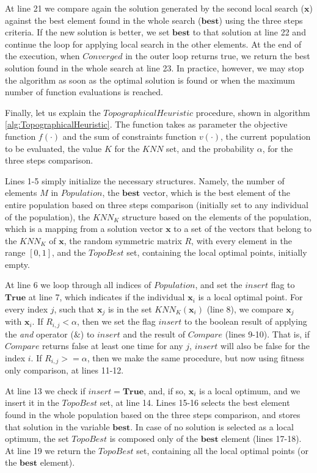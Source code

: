 At line 21 we compare again the solution generated by the second local search ($\bm{x}$) against the best element found in the whole search ($\bm{best}$) using the three steps criteria. If the new solution is better, we set $\bm{best}$ to that solution at line 22 and continue the loop for applying local search in the other elements. At the end of the execution, when $Converged$ in the outer loop returns true, we return the best solution found in the whole search at line 23. In practice, however, we may stop the algorithm as soon as the optimal solution is found or when the maximum number of function evaluations is reached.

Finally, let us explain the $TopographicalHeuristic$ procedure, shown in algorithm \ref{alg:TopographicalHeuristic}. The function takes as parameter the objective function $f(\cdot)$ and the sum of constraints function $v(\cdot)$, the current population to be evaluated, the value $K$ for the $KNN$ set, and the probability $\alpha$, for the three steps comparison.





Lines 1-5 simply initialize the necessary structures. Namely, the number of elements $M$ in $Population$, the $\bm{best}$ vector, which is the best element of the entire population based on three steps comparison (initially set to any individual of the population), the $KNN_K$ structure based on the elements of the population, which is a mapping from a solution vector $\bm{x}$ to a set of the vectors that belong to the $KNN_K$ of $\bm{x}$, the random symmetric matrix $R$, with every element in the range $[0, 1]$, and the $TopoBest$ set, containing the local optimal points, initially empty.

At line 6 we loop through all indices of $Population$, and set the $insert$ flag to $\bm{True}$ at line 7, which indicates if the individual $\bm{x}_i$ is a local optimal point. For every index $j$, such that $\bm{x}_j$ is in the set $KNN_K(\bm{x}_i)$ (line 8), we compare $\bm{x}_j$ with $\bm{x}_i$. If $R_{i, j} < \alpha$, then we set the flag $insert$ to the boolean result of applying the \textit{and} operator ($\&$) to $insert$ and the result of $Compare$ (lines 9-10). That is, if $Compare$ returns false at least one time for any $j$, $insert$ will also be false for the index $i$. If $R_{i, j} >= \alpha$, then we make the same procedure, but now using fitness only comparison, at lines 11-12.

At line 13 we check if $insert = \bm{True}$, and, if so, $\bm{x}_i$ is a local optimum, and we insert it in the $TopoBest$ set, at line 14. Lines 15-16 selects the best element found in the whole population based on the three steps comparison, and stores that solution in the variable $\bm{best}$. In case of no solution is selected as a local optimum, the set $TopoBest$ is composed only of the $\bm{best}$ element (lines 17-18). At line 19 we return the $TopoBest$ set, containing all the local optimal points (or the $\bm{best}$ element).


